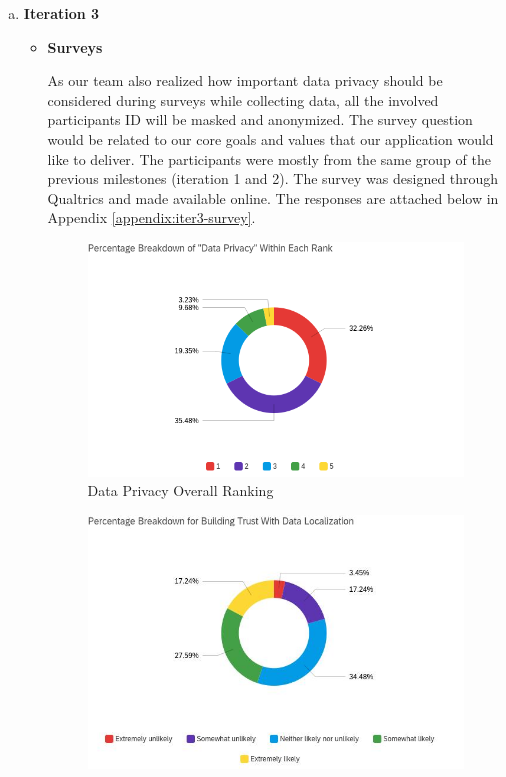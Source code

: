 \begin{enumerate}[a)]
\begin{itemize}
          \end{itemize}
        \item \textbf{Iteration 3}
          \begin{itemize}
            \item \textbf{Surveys}
              \par As our team also realized how important data privacy should be considered during surveys while
              collecting data, all the involved participants ID will be masked and anonymized. The survey question
              would be related to our core goals and values that our application would like to deliver. The
              participants were mostly from the same group of the previous milestones (iteration 1 and 2). The
              survey was designed through Qualtrics and made available online. The responses are attached below
              in Appendix \ref{appendix:iter3-survey}.
                \begin{figure}[H]
                  \centering
                  \includegraphics[width=\linewidth]{img/prototype/iter3-survey-findings-1.png}
                  \caption{Data Privacy Overall Ranking}
                  \label{fig:iter3-survey-findings-1}
                \end{figure}
                \begin{figure}[H]
                  \centering
                  \includegraphics[width=\linewidth]{img/prototype/iter3-survey-findings-2.png}

\end{figure}
\end{itemize}
\end{enumerate}
